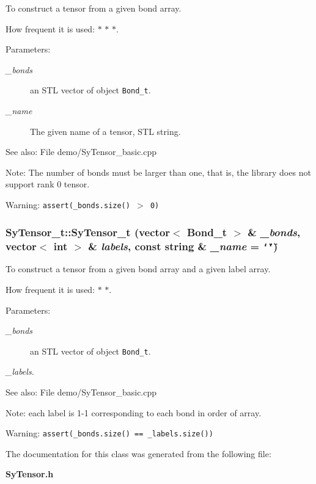 To construct a tensor from a given bond array.\par
 How frequent it is used: $\ast$ $\ast$ $\ast$. 

\begin{Desc}
\item[Parameters:]
\begin{description}
\item[{\em \_\-bonds}]an STL vector of object {\tt Bond\_\-t}. \item[{\em \_\-name}]The given name of a tensor, STL string. \end{description}
\end{Desc}
\begin{Desc}
\item[See also:]File demo/Sy\-Tensor\_\-basic.cpp \end{Desc}
\begin{Desc}
\item[Note:]The number of bonds must be larger than one, that is, the library does not support rank 0 tensor. \end{Desc}
\begin{Desc}
\item[Warning:]{\tt assert(\_\-bonds.size() $>$ 0)} \end{Desc}
\subsubsection{\setlength{\rightskip}{0pt plus 5cm}Sy\-Tensor\_\-t::Sy\-Tensor\_\-t (vector$<$ Bond\_\-t $>$ \& {\em \_\-bonds}, vector$<$ int $>$ \& {\em labels}, const string \& {\em \_\-name} = {\tt \char`\"{}\char`\"{}})}\label{d1/d9f/classSyTensor__t_24c808ed67b410bf044f4078acd6d278}


To construct a tensor from a given bond array and a given label array.\par
 How frequent it is used: $\ast$ $\ast$. 

\begin{Desc}
\item[Parameters:]
\begin{description}
\item[{\em \_\-bonds}]an STL vector of object {\tt Bond\_\-t}. \item[{\em \_\-labels.}]\end{description}
\end{Desc}
\begin{Desc}
\item[See also:]File demo/Sy\-Tensor\_\-basic.cpp \end{Desc}
\begin{Desc}
\item[Note:]each label is 1-1 corresponding to each bond in order of array. \end{Desc}
\begin{Desc}
\item[Warning:]{\tt assert(\_\-bonds.size() == \_\-labels.size())} \end{Desc}


The documentation for this class was generated from the following file:\begin{CompactItemize}
\item 
\bf{Sy\-Tensor.h}\end{CompactItemize}
